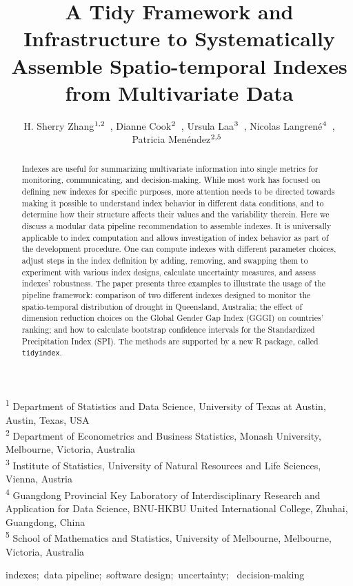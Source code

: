 \documentclass[
]{interact}
\title{A Tidy Framework and Infrastructure to Systematically Assemble
Spatio-temporal Indexes from Multivariate Data}
\author{H. Sherry
Zhang$\textsuperscript{1,2}$~\orcidlink{0000-0002-7122-1463}, Dianne
Cook$\textsuperscript{2}$~\orcidlink{0000-0002-3813-7155}, Ursula
Laa$\textsuperscript{3}$~\orcidlink{0000-0002-0249-6439}, Nicolas
Langrené$\textsuperscript{4}$~\orcidlink{0000-0001-7601-4618}, Patricia
Menéndez$\textsuperscript{2,5}$~\orcidlink{0000-0003-0701-6315}}
\begin{document}
\captionsetup{labelsep=space}
\maketitle
\textsuperscript{1} Department of Statistics and Data
Science, University of Texas at Austin, Austin,
Texas, USA\\ \textsuperscript{2} Department of Econometrics and Business
Statistics, Monash University, Melbourne,
Victoria, Australia\\ \textsuperscript{3} Institute of
Statistics, University of Natural Resources and Life
Sciences, Vienna, Austria\\ \textsuperscript{4} Guangdong Provincial Key
Laboratory of Interdisciplinary Research and Application for Data
Science, BNU-HKBU United International College, Zhuhai,
Guangdong, China\\ \textsuperscript{5} School of Mathematics and
Statistics, University of Melbourne, Melbourne, Victoria, Australia
\begin{abstract}
Indexes are useful for summarizing multivariate information into single
metrics for monitoring, communicating, and decision-making. While most
work has focused on defining new indexes for specific purposes, more
attention needs to be directed towards making it possible to understand
index behavior in different data conditions, and to determine how their
structure affects their values and the variability therein. Here we
discuss a modular data pipeline recommendation to assemble indexes. It
is universally applicable to index computation and allows investigation
of index behavior as part of the development procedure. One can compute
indexes with different parameter choices, adjust steps in the index
definition by adding, removing, and swapping them to experiment with
various index designs, calculate uncertainty measures, and assess
indexes' robustness. The paper presents three examples to illustrate the
usage of the pipeline framework: comparison of two different indexes
designed to monitor the spatio-temporal distribution of drought in
Queensland, Australia; the effect of dimension reduction choices on the
Global Gender Gap Index (GGGI) on countries' ranking; and how to
calculate bootstrap confidence intervals for the Standardized
Precipitation Index (SPI). The methods are supported by a new R package,
called \texttt{tidyindex}.
\end{abstract}
\begin{keywords}
\def\sep{;\ }
indexes\sep data pipeline\sep software design\sep uncertainty\sep 
decision-making
\end{keywords}
\end{document}

